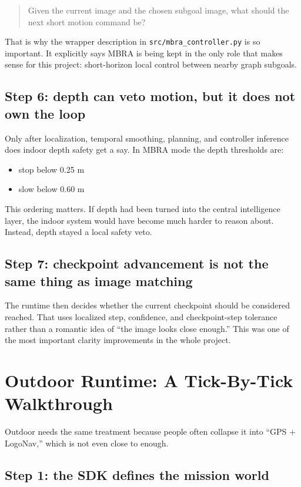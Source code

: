 \documentclass[11pt]{article}
\begin{document}
\begin{quote}
Given the current image and the chosen subgoal image, what should the next short
motion command be?
\end{quote}

That is why the wrapper description in \texttt{src/mbra\_controller.py} is so
important. It explicitly says MBRA is being kept in the only role that makes sense
for this project: short-horizon local control between nearby graph subgoals.

\subsection{Step 6: depth can veto motion, but it does not own the loop}

Only after localization, temporal smoothing, planning, and controller inference does
indoor depth safety get a say. In MBRA mode the depth thresholds are:

\begin{itemize}[nosep]
  \item stop below 0.25 m
  \item slow below 0.60 m
\end{itemize}

This ordering matters. If depth had been turned into the central intelligence layer,
the indoor system would have become much harder to reason about. Instead, depth
stayed a local safety veto.

\subsection{Step 7: checkpoint advancement is not the same thing as image matching}

The runtime then decides whether the current checkpoint should be considered reached.
That uses localized step, confidence, and checkpoint-step tolerance rather than a
romantic idea of ``the image looks close enough.'' This was one of the most
important clarity improvements in the whole project.

\section{Outdoor Runtime: A Tick-By-Tick Walkthrough}

Outdoor needs the same treatment because people often collapse it into ``GPS +
LogoNav,'' which is not even close to enough.

\subsection{Step 1: the SDK defines the mission world}
\end{document}
